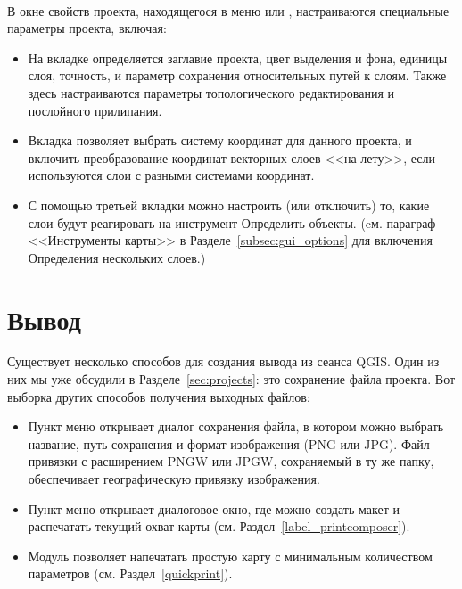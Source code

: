  \\

В окне свойств проекта, находящегося в меню  или , настраиваются специальные параметры
проекта, включая:

\begin{itemize}
\item На вкладке  определяется заглавие проекта, цвет выделения
и фона, единицы слоя, точность, и параметр сохранения относительных путей
к слоям. Также здесь настраиваются параметры топологического редактирования
и послойного прилипания.
\item Вкладка  позволяет выбрать систему координат
для данного проекта, и включить преобразование координат векторных слоев
<<на лету>>, если используются слои с разными системами координат.
\item С помощью третьей вкладки  можно настроить
(или отключить) то, какие слои будут реагировать на инструмент Определить
объекты. (cм. параграф <<Инструменты карты>> в Разделе~\ref{subsec:gui_options}
для включения Определения нескольких слоев.)
\end{itemize}

\section{Вывод}\label{sec:output}

Существует несколько способов для создания вывода из сеанса QGIS. Один из
них мы уже обсудили в Разделе~\ref{sec:projects}: это сохранение файла
проекта. Вот выборка других способов получения выходных файлов:

\begin{itemize}
\item Пункт меню 
открывает диалог сохранения файла, в котором можно выбрать название, путь сохранения
и формат изображения (PNG или JPG). Файл привязки с расширением PNGW
или JPGW, сохраняемый в ту же папку, обеспечивает географическую привязку
изображения.
\item Пункт меню 
открывает диалоговое окно, где можно создать макет и распечатать текущий
охват карты (см. Раздел~\ref{label_printcomposer}).
\item Модуль  позволяет напечатать
простую карту с минимальным количеством параметров (см. Раздел~\ref{quickprint}).
\end{itemize}

